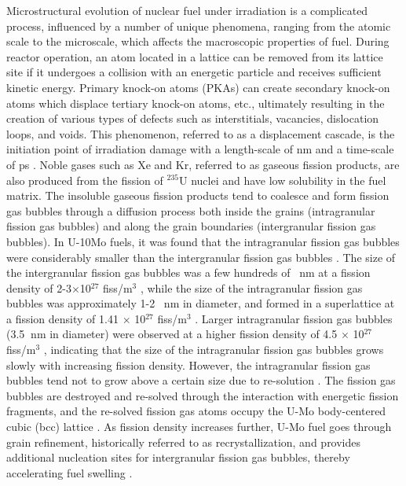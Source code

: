 \documentclass[preprint,12pt]{elsarticle}
\begin{document}
\indent Microstructural evolution of nuclear fuel under irradiation is a complicated process, influenced by a number of unique phenomena, ranging from the atomic scale to the microscale, which affects the macroscopic properties of fuel. During reactor operation, an atom located in a lattice can be removed from its lattice site if it undergoes a collision with an energetic particle and receives sufficient kinetic energy. Primary knock-on atoms (PKAs) can create secondary knock-on atoms which displace tertiary knock-on atoms, etc., ultimately resulting in the creation of various types of defects such as interstitials, vacancies, dislocation loops, and voids. This phenomenon, referred to as a displacement cascade, is the initiation point of irradiation damage with a length-scale of nm and a time-scale of ps \cite{nordlund2018primary}. Noble gases such as Xe and Kr, referred to as gaseous fission products, are also produced from the fission of $^{235}$U nuclei and have low solubility in the fuel matrix. The insoluble gaseous fission products tend to coalesce and form fission gas bubbles through a diffusion process both inside the grains (intragranular fission gas bubbles) and along the grain boundaries (intergranular fission gas bubbles). In U-10Mo fuels, it was found that the intragranular fission gas bubbles were considerably smaller than the intergranular fission gas bubbles \cite{kim2011fission, kim2008characterization, van2008transmission}. The size of the intergranular fission gas bubbles was a few hundreds of \SI{}{\nano\metre} at a fission density of 2-3$\times$10$^{27}$ fiss/m$^{3}$ \cite{kim2011fission, kim2008characterization}, while the size of the intragranular fission gas bubbles was approximately 1-2 \SI{}{\nano\metre} in diameter, and formed in a superlattice at a fission density of 1.41 $\times$ 10$^{27}$ fiss/m$^{3}$ \cite{van2008transmission}. Larger intragranular fission gas bubbles (3.5 $\SI{}{\nano\metre}$ in diameter) were observed at a higher fission density of 4.5 $\times$ 10$^{27}$ fiss/m$^{3}$ \cite{gan2010transmission}, indicating that the size of the intragranular fission gas bubbles grows slowly with increasing fission density. However, the intragranular fission gas bubbles tend not to grow above a certain size due to re-solution \cite{olander2006re}. The fission gas bubbles are destroyed and re-solved through the interaction with energetic fission fragments, and the re-solved fission gas atoms occupy the U-Mo body-centered cubic (bcc) lattice \cite{olander2006re}. As fission density increases further, U-Mo fuel goes through grain refinement, historically referred to as recrystallization, and provides additional nucleation sites for intergranular fission gas bubbles, thereby accelerating fuel swelling \cite{rest2005model, kim2013recrystallization, liang2016mesoscale}.
\end{document}
